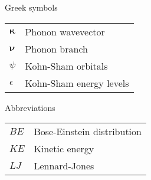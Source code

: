 Greek symbols\\
\begin{longtable}{ l l }
$\pmb{\kappa}$ & Phonon wavevector\\ 
$\pmb{\nu}$ & Phonon branch\\
$\psi$ & Kohn-Sham orbitals\\
$\epsilon$ & Kohn-Sham energy levels\\
\end{longtable}

Abbreviations\\
\begin{longtable}{ l l }
$BE$ & Bose-Einstein distribution \\
$KE$ & Kinetic energy\\
$LJ$ & Lennard-Jones\\
\end{longtable}

